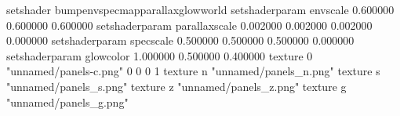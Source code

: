 setshader bumpenvspecmapparallaxglowworld
setshaderparam envscale 0.600000 0.600000 0.600000
setshaderparam parallaxscale 0.002000 0.002000 0.002000 0.000000
setshaderparam specscale 0.500000 0.500000 0.500000 0.000000
setshaderparam glowcolor 1.000000 0.500000 0.400000
texture 0 "unnamed/panels-c.png" 0 0 0 1
texture n "unnamed/panels_n.png"
texture s "unnamed/panels_s.png"
texture z "unnamed/panels_z.png"
texture g "unnamed/panels_g.png"
